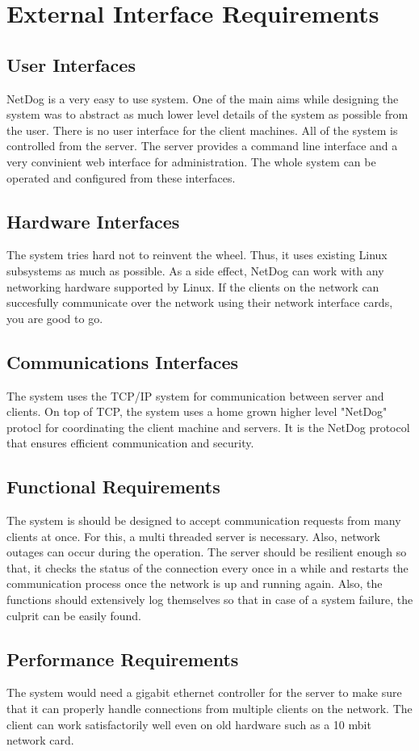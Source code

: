 \documentclass{scrreprt}
\begin{document}
\chapter{External Interface Requirements}

\section{User Interfaces}
NetDog is a very easy to use system. One of the main aims while designing the
system was to abstract as much lower level details of the system as possible
from the user. There is no user interface for the client machines. All of the
system is controlled from the server. The server provides a command line
interface and a very convinient web interface for administration. The whole
system can be operated and configured from these interfaces.

\section{Hardware Interfaces}
The system tries hard not to reinvent the wheel. Thus, it uses existing Linux
subsystems as much as possible. As a side effect, NetDog can work with any
networking hardware supported by Linux. If the clients on the network can
succesfully communicate over the network using their network interface cards,
you are good to go.

\section{Communications Interfaces}
The system uses the TCP/IP system for communication between server and clients.
On top of TCP, the system uses a home grown higher level "NetDog" protocl for
coordinating the client machine and servers. It is the NetDog protocol that
ensures efficient communication and security.

\section{Functional Requirements}
The system is should be designed to accept communication requests from many
clients at once. For this, a multi threaded server is necessary. Also, network
outages can occur during the operation. The server should be resilient enough
so that, it checks the status of the connection every once in a while and
restarts the communication process once the network is up and running again.
Also, the functions should extensively log themselves so that in case of a
system failure, the culprit can be easily found.

\section{Performance Requirements}
The system would need a gigabit ethernet controller for the server to make sure
that it can properly handle connections from multiple clients on the network.
The client can work satisfactorily well even on old hardware such as a 10 mbit
network card.
\end{document}

